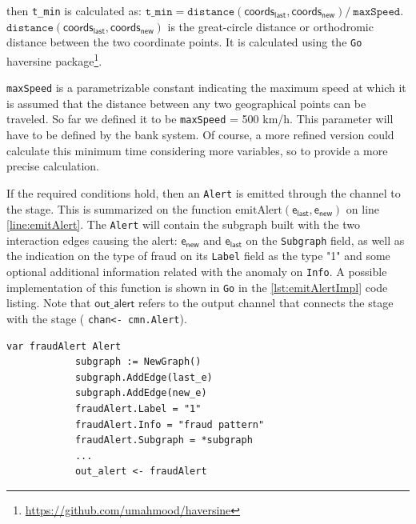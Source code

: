 \begin{itemize}
    then \texttt{t\_min} is calculated as: $\texttt{t\_min} = \texttt{distance}(\mathsf{coords_{last}}, \mathsf{coords_{new}})/\ \texttt{maxSpeed}$.\\
    $\texttt{distance}(\mathsf{coords_{last}}, \mathsf{coords_{new}})$ is the great-circle distance or orthodromic distance between the two coordinate points. It is calculated using the \texttt{Go} haversine package\footnote{\url{https://github.com/umahmood/haversine}}.
    
    \texttt{maxSpeed} is a parametrizable constant indicating the maximum speed at which it is assumed that the distance between any two geographical points can be traveled. So far we defined it to be \texttt{maxSpeed} = 500 km/h. This parameter will have to be defined by the bank system. Of course, a more refined version could calculate this minimum time considering more variables, so to provide a more precise calculation.

    If the required conditions hold, then an \texttt{Alert} is emitted through the \alertch channel to the \sink stage. This is summarized on the function $\text{emitAlert}(\mathsf{e_{last}}, \mathsf{e_{new}})$ on line \ref{line:emitAlert}. The \texttt{Alert} will contain the subgraph built with the two interaction edges causing the alert: $\mathsf{e_{new}}$ and $\mathsf{e_{last}}$ on the \texttt{Subgraph} field, as well as the indication on the type of fraud on its \texttt{Label} field as the type "1" and some optional additional information related with the anomaly on \texttt{Info}. A possible implementation of this function is shown in \texttt{Go} in the \ref{lst:emitAlertImpl} code listing. Note that $\mathsf{out\_alert}$ refers to the output \alertch channel that connects the \filter stage with the \sink stage ( \texttt{chan<- cmn.Alert}).

    \begin{center}
    \lstset{style=golangStyle}
    \begin{lstlisting}[caption={Possible implementation of $\text{emitAlert}(\mathsf{e_{last}}, \mathsf{e_{new}})$}, label={lst:emitAlertImpl}]
            var fraudAlert Alert 
            subgraph := NewGraph()
            subgraph.AddEdge(last_e)
            subgraph.AddEdge(new_e)
            fraudAlert.Label = "1"
            fraudAlert.Info = "fraud pattern"
            fraudAlert.Subgraph = *subgraph
            ...
            out_alert <- fraudAlert
    \end{lstlisting}
    \end{center}
\end{itemize}

